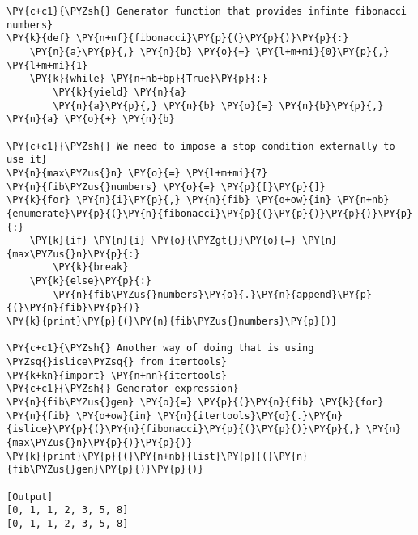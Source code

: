 \begin{Verbatim}[label=\makebox{\url{https://github.com/lucabaldini/cmepda/tree/master/slides/latex/snippets/fibonacci.py}},commandchars=\\\{\}]
\PY{c+c1}{\PYZsh{} Generator function that provides infinte fibonacci numbers}
\PY{k}{def} \PY{n+nf}{fibonacci}\PY{p}{(}\PY{p}{)}\PY{p}{:}
    \PY{n}{a}\PY{p}{,} \PY{n}{b} \PY{o}{=} \PY{l+m+mi}{0}\PY{p}{,} \PY{l+m+mi}{1}
    \PY{k}{while} \PY{n+nb+bp}{True}\PY{p}{:}
        \PY{k}{yield} \PY{n}{a}
        \PY{n}{a}\PY{p}{,} \PY{n}{b} \PY{o}{=} \PY{n}{b}\PY{p}{,} \PY{n}{a} \PY{o}{+} \PY{n}{b}

\PY{c+c1}{\PYZsh{} We need to impose a stop condition externally to use it}
\PY{n}{max\PYZus{}n} \PY{o}{=} \PY{l+m+mi}{7}
\PY{n}{fib\PYZus{}numbers} \PY{o}{=} \PY{p}{[}\PY{p}{]}
\PY{k}{for} \PY{n}{i}\PY{p}{,} \PY{n}{fib} \PY{o+ow}{in} \PY{n+nb}{enumerate}\PY{p}{(}\PY{n}{fibonacci}\PY{p}{(}\PY{p}{)}\PY{p}{)}\PY{p}{:}
    \PY{k}{if} \PY{n}{i} \PY{o}{\PYZgt{}}\PY{o}{=} \PY{n}{max\PYZus{}n}\PY{p}{:}
        \PY{k}{break}
    \PY{k}{else}\PY{p}{:}
        \PY{n}{fib\PYZus{}numbers}\PY{o}{.}\PY{n}{append}\PY{p}{(}\PY{n}{fib}\PY{p}{)}
\PY{k}{print}\PY{p}{(}\PY{n}{fib\PYZus{}numbers}\PY{p}{)}
      
\PY{c+c1}{\PYZsh{} Another way of doing that is using \PYZsq{}islice\PYZsq{} from itertools}
\PY{k+kn}{import} \PY{n+nn}{itertools}
\PY{c+c1}{\PYZsh{} Generator expression}
\PY{n}{fib\PYZus{}gen} \PY{o}{=} \PY{p}{(}\PY{n}{fib} \PY{k}{for} \PY{n}{fib} \PY{o+ow}{in} \PY{n}{itertools}\PY{o}{.}\PY{n}{islice}\PY{p}{(}\PY{n}{fibonacci}\PY{p}{(}\PY{p}{)}\PY{p}{,} \PY{n}{max\PYZus{}n}\PY{p}{)}\PY{p}{)}
\PY{k}{print}\PY{p}{(}\PY{n+nb}{list}\PY{p}{(}\PY{n}{fib\PYZus{}gen}\PY{p}{)}\PY{p}{)}

[Output]
[0, 1, 1, 2, 3, 5, 8]
[0, 1, 1, 2, 3, 5, 8]
\end{Verbatim}